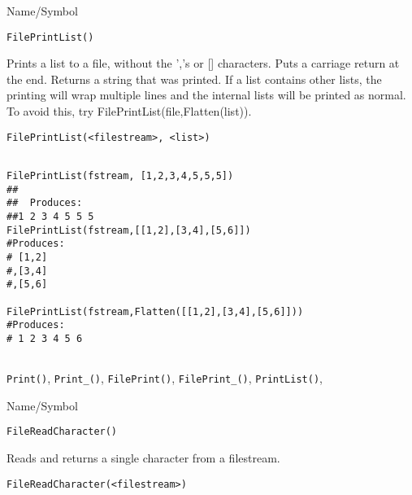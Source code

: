 \begin{desc}{Name/Symbol}
\item[Name/Symbol]	\verb+FilePrintList()+

\item[Description]	Prints a list to a file, without the ','s or []
  characters. Puts a carriage return at the end.  Returns a string
  that was printed.  If a list contains other lists, the printing will
  wrap multiple lines and the internal lists will be printed as
  normal.  To avoid this, try FilePrintList(file,Flatten(list)).

\item[Usage]
\begin{verbatim}
FilePrintList(<filestream>, <list>)
\end{verbatim}

\item[Example]
\begin{verbatim}

FilePrintList(fstream, [1,2,3,4,5,5,5])
##
##  Produces:
##1 2 3 4 5 5 5
FilePrintList(fstream,[[1,2],[3,4],[5,6]])
#Produces:
# [1,2]
#,[3,4]
#,[5,6]

FilePrintList(fstream,Flatten([[1,2],[3,4],[5,6]]))
#Produces:
# 1 2 3 4 5 6


\end{verbatim}

\item[See Also]	\verb+Print()+, \verb+Print_()+, \verb+FilePrint()+, \verb+FilePrint_()+, \verb+PrintList()+,
\end{desc}

\rl




\begin{desc}{Name/Symbol}
\item[Name/Symbol]	\verb+FileReadCharacter()+

\item[Description]	Reads and returns a single character from a filestream.

\item[Usage]
\begin{verbatim}
FileReadCharacter(<filestream>)
\end{verbatim}

\item[Example]	

\item[See Also]	
\end{desc}

\rl




